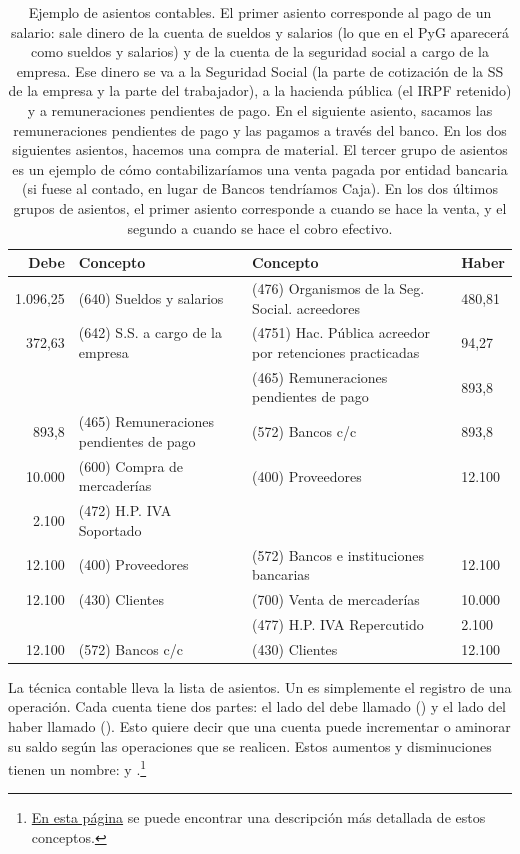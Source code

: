 \documentclass[nochap,palatino,shortheader]{apuntes}
\begin{document}
\begin{table}[hbtp]
\centering
\begin{tabular}{r|p{5cm}||p{5cm}|l}
\textbf{Debe} & \textbf{Concepto} & \textbf{Concepto} & \textbf{Haber} \\ \toprule
1.096,25 & (640) Sueldos y salarios & (476) Organismos de la Seg. Social. acreedores & 480,81 \\
372,63 & (642) S.S. a cargo de la empresa & (4751) Hac. Pública acreedor por retenciones practicadas & 94,27 \\
 & & (465) Remuneraciones pendientes de pago & 893,8 \\ \midrule
 893,8 & (465) Remuneraciones pendientes de pago & (572) Bancos c/c & 893,8 \\ \midrule \midrule
10.000 	& (600) Compra de mercaderías & (400) Proveedores &	12.100 \\
2.100 	& (472) H.P. IVA Soportado & &  \\ \midrule
12.100 	& (400) Proveedores & (572) Bancos e instituciones bancarias &	12.100 \\ \midrule \midrule
12.100 	& (430) Clientes & 	 (700) Venta de mercaderías & 10.000 \\
 & & (477) H.P. IVA Repercutido & 2.100 \\ \midrule
12.100 & (572) Bancos c/c & (430) Clientes & 12.100 \\
 \bottomrule
\end{tabular}
\caption{Ejemplo de asientos contables. El primer asiento corresponde al pago de un salario: sale dinero de la cuenta de sueldos y salarios (lo que en el PyG aparecerá como sueldos y salarios) y de la cuenta de la seguridad social a cargo de la empresa. Ese dinero se va a la Seguridad Social (la parte de cotización de la SS de la empresa y la parte del trabajador), a la hacienda pública (el IRPF retenido) y a remuneraciones pendientes de pago. En el siguiente asiento, sacamos las remuneraciones pendientes de pago y las pagamos a través del banco. En los dos siguientes asientos, hacemos una compra de material. El tercer grupo de asientos es un ejemplo de cómo contabilizaríamos una venta pagada por entidad bancaria (si fuese al contado, en lugar de Bancos tendríamos Caja). En los dos últimos grupos de asientos, el primer asiento corresponde a cuando se hace la venta, y el segundo a cuando se hace el cobro efectivo.}
\label{tab:Asientos}
\end{table}

La técnica contable lleva la lista de asientos. Un  es simplemente el registro de una operación. Cada cuenta tiene dos partes: el lado del debe llamado \textbf{} () y el lado del haber llamado \textbf{} ().
Esto quiere decir que una cuenta puede incrementar o aminorar su saldo según las operaciones que se realicen.
Estos aumentos y disminuciones tienen un nombre:  y .\footnote{
 \href{http://www.plangeneralcontable.com/?tit=guia-de-contabilidad-para-torpes&name=GeTia&contentId=man_ctorpes&manPage=8}{En esta página} se puede encontrar una descripción más detallada de estos conceptos.}
\end{document}
